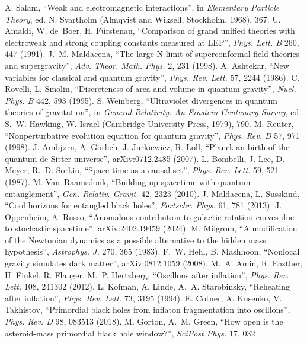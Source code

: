  A. Salam, ``Weak and electromagnetic interactions'', in \emph{Elementary Particle Theory}, ed. N. Svartholm (Almqvist and
Wiksell, Stockholm, 1968), 367.
 U. Amaldi, W. de~Boer, H. F{\"u}rstenau, ``Comparison of grand unified theories with electroweak and strong coupling
constants measured at LEP'', \emph{Phys. Lett. B} 260, 447 (1991).
 J.~M. Maldacena, ``The large N limit of superconformal field theories and supergravity'', \emph{Adv. Theor. Math. Phys.}
2, 231 (1998).
 A. Ashtekar, ``New variables for classical and quantum gravity'', \emph{Phys. Rev. Lett.} 57, 2244 (1986).
 C. Rovelli, L. Smolin, ``Discreteness of area and volume in quantum gravity'', \emph{Nucl. Phys. B} 442, 593
(1995).
 S. Weinberg, ``Ultraviolet divergences in quantum theories of gravitation'', in \emph{General Relativity: An Einstein
Centenary Survey}, ed. S.~W. Hawking, W. Israel (Cambridge University Press, 1979), 790.
 M. Reuter, ``Nonperturbative evolution equation for quantum gravity'', \emph{Phys. Rev. D} 57, 971 (1998).
 J. Ambj{\o}rn, A. G{\"o}rlich, J. Jurkiewicz, R. Loll, ``Planckian birth of the quantum de Sitter universe'',
arXiv:0712.2485 (2007).
 L. Bombelli, J. Lee, D. Meyer, R.~D. Sorkin, ``Space-time as a causal set'', \emph{Phys. Rev. Lett.} 59, 521 (1987).
 M. Van~Raamsdonk, ``Building up spacetime with quantum entanglement'', \emph{Gen. Relativ. Gravit.} 42, 2323 (2010).
 J. Maldacena, L. Susskind, ``Cool horizons for entangled black holes'', \emph{Fortschr. Phys.} 61, 781 (2013).
 J. Oppenheim, A. Russo, ``Anomalous contribution to galactic rotation curves due to stochastic spacetime'',
arXiv:2402.19459 (2024).
 M. Milgrom, ``A modification of the Newtonian dynamics as a possible alternative to the hidden mass hypothesis'',
\emph{Astrophys. J.} 270, 365 (1983).
 F.~W. Hehl, B. Mashhoon, ``Nonlocal gravity simulates dark matter'', arXiv:0812.1059 (2008).
 M.~A. Amin, R. Easther, H. Finkel, R. Flauger, M.~P. Hertzberg, ``Oscillons after inflation'', \emph{Phys. Rev. Lett.} 108,
241302 (2012).
 L. Kofman, A. Linde, A.~A. Starobinsky, ``Reheating after inflation'', \emph{Phys. Rev. Lett.} 73, 3195 (1994).
 E. Cotner, A. Kusenko, V. Takhistov, ``Primordial black holes from inflaton fragmentation into oscillons'', \emph{Phys.
Rev. D} 98, 083513 (2018).
 M. Gorton, A.~M. Green, ``How open is the asteroid-mass primordial black hole window?'', \emph{SciPost Phys.} 17, 032
